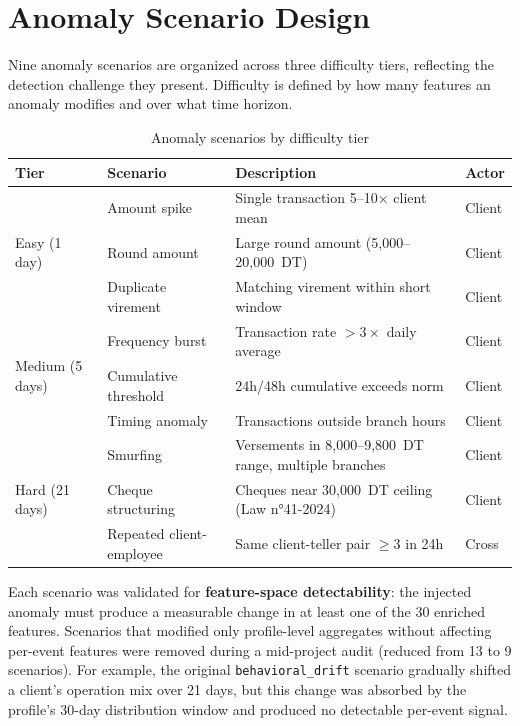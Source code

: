 \section{Anomaly Scenario Design}
\label{sec:scenarios}

Nine anomaly scenarios are organized across three difficulty tiers, reflecting
the detection challenge they present. Difficulty is defined by how many features
an anomaly modifies and over what time horizon.

\begin{table}[H]
\centering
\caption{Anomaly scenarios by difficulty tier}
\label{tab:anomaly-scenarios}
\begin{tabular}{@{}llp{6.5cm}l@{}}
\toprule
\textbf{Tier} & \textbf{Scenario} & \textbf{Description} & \textbf{Actor} \\
\midrule
\multirow{3}{*}{Easy (1 day)}
    & Amount spike      & Single transaction 5--10$\times$ client mean
                        & Client \\
    & Round amount      & Large round amount (5,000--20,000~DT)
                        & Client \\
    & Duplicate virement & Matching virement within short window
                        & Client \\
\midrule
\multirow{3}{*}{Medium (5 days)}
    & Frequency burst   & Transaction rate $>3\times$ daily average
                        & Client \\
    & Cumulative threshold & 24h/48h cumulative exceeds norm
                        & Client \\
    & Timing anomaly    & Transactions outside branch hours
                        & Client \\
\midrule
\multirow{3}{*}{Hard (21 days)}
    & Smurfing          & Versements in 8,000--9,800~DT range, multiple branches
                        & Client \\
    & Cheque structuring & Cheques near 30,000~DT ceiling (Law n°41-2024)
                        & Client \\
    & Repeated client-employee & Same client-teller pair $\geq$3 in 24h
                        & Cross \\
\bottomrule
\end{tabular}
\end{table}

Each scenario was validated for \textbf{feature-space detectability}: the injected
anomaly must produce a measurable change in at least one of the 30 enriched
features. Scenarios that modified only profile-level aggregates without affecting
per-event features were removed during a mid-project audit (reduced from 13 to 9
scenarios). For example, the original \texttt{behavioral\_drift} scenario gradually
shifted a client's operation mix over 21 days, but this change was absorbed by the
profile's 30-day distribution window and produced no detectable per-event signal.

